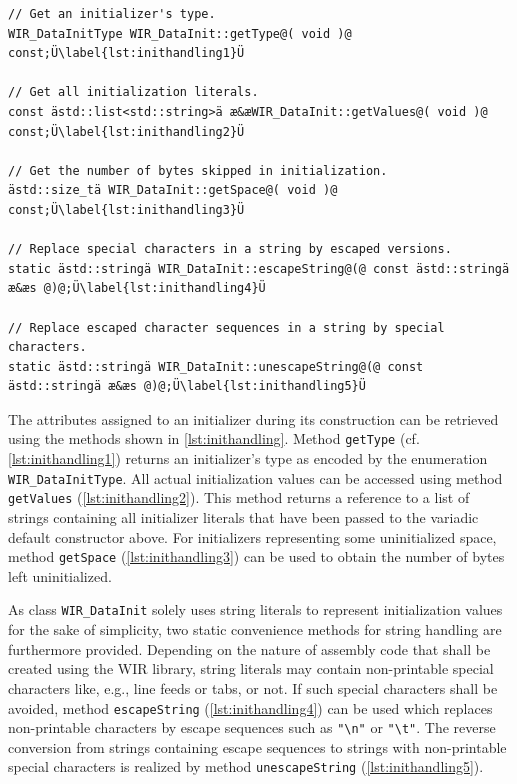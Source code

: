 \begin{lstlisting}[style=code,float=!b,caption={Initializer Handling and String Processing of Class \texttt{WIR\_DataInit}},label=lst:inithandling]
// Get an initializer's type.
WIR_DataInitType WIR_DataInit::getType@( void )@ const;Ü\label{lst:inithandling1}Ü

// Get all initialization literals.
const ästd::list<std::string>ä æ&æWIR_DataInit::getValues@( void )@ const;Ü\label{lst:inithandling2}Ü

// Get the number of bytes skipped in initialization.
ästd::size_tä WIR_DataInit::getSpace@( void )@ const;Ü\label{lst:inithandling3}Ü

// Replace special characters in a string by escaped versions.
static ästd::stringä WIR_DataInit::escapeString@(@ const ästd::stringä æ&æs @)@;Ü\label{lst:inithandling4}Ü

// Replace escaped character sequences in a string by special characters.
static ästd::stringä WIR_DataInit::unescapeString@(@ const ästd::stringä æ&æs @)@;Ü\label{lst:inithandling5}Ü
\end{lstlisting}

The attributes assigned to an initializer during its construction can be retrieved using the methods shown in \cref{lst:inithandling}.
Method \texttt{getType} (cf. \cref{lst:inithandling1}) returns an initializer's type as encoded by the enumeration \texttt{WIR\_DataInit\-Type}.
All actual initialization values can be accessed using method \texttt{getValues} (\cref{lst:inithandling2}).
This method returns a reference to a list of strings containing all initializer literals that have been passed to the variadic default constructor above.
For initializers representing some uninitialized space, method \texttt{getSpace} (\cref{lst:inithandling3}) can be used to obtain the number of bytes left uninitialized.

As class \texttt{WIR\_DataInit} solely uses string literals to represent initialization values for the sake of simplicity, two static convenience methods for string handling are furthermore provided.
Depending on the nature of assembly code that shall be created using the \gls{WIR} library, string literals may contain non-printable special characters like, e.g., line feeds or tabs, or not.
If such special characters shall be avoided, method \texttt{escapeString} (\cref{lst:inithandling4}) can be used which replaces non-printable characters by escape sequences such as \texttt{"\textbackslash{}n"} or \texttt{"\textbackslash{}t"}.
The reverse conversion from strings containing escape sequences to strings with non-printable special characters is realized by method \texttt{unescapeString} (\cref{lst:inithandling5}).


\cleardoubleoddpage
